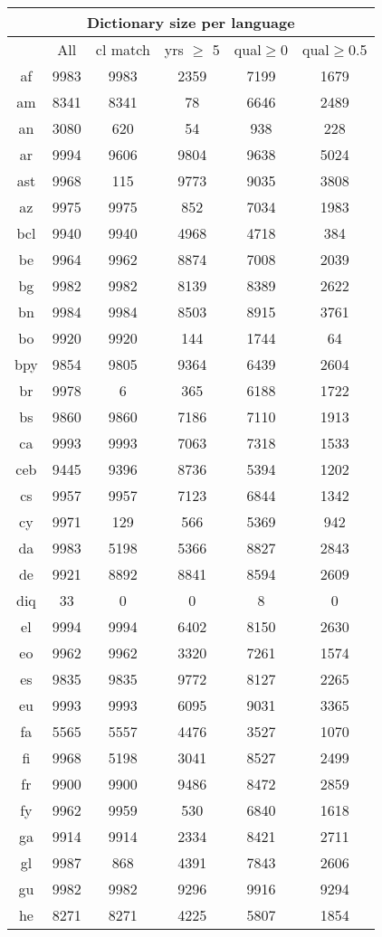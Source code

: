 \begin{figure}[h]
\centering
\begin{tabular}{cccccc}
\multicolumn{6}{c}{Dictionary size per language}\\
\hline\hline
&All&cl match&yrs $\geq$ 5&qual$\geq$0&qual$\geq$0.5\\
\hline\hline
af&9983&9983&2359&7199&1679\\
am&8341&8341&78&6646&2489\\
an&3080&620&54&938&228\\
ar&9994&9606&9804&9638&5024\\
ast&9968&115&9773&9035&3808\\
az&9975&9975&852&7034&1983\\
bcl&9940&9940&4968&4718&384\\
be&9964&9962&8874&7008&2039\\
bg&9982&9982&8139&8389&2622\\
bn&9984&9984&8503&8915&3761\\
bo&9920&9920&144&1744&64\\
bpy&9854&9805&9364&6439&2604\\
br&9978&6&365&6188&1722\\
bs&9860&9860&7186&7110&1913\\
ca&9993&9993&7063&7318&1533\\
ceb&9445&9396&8736&5394&1202\\
cs&9957&9957&7123&6844&1342\\
cy&9971&129&566&5369&942\\
da&9983&5198&5366&8827&2843\\
de&9921&8892&8841&8594&2609\\
diq&33&0&0&8&0\\
el&9994&9994&6402&8150&2630\\
eo&9962&9962&3320&7261&1574\\
es&9835&9835&9772&8127&2265\\
eu&9993&9993&6095&9031&3365\\
fa&5565&5557&4476&3527&1070\\
fi&9968&5198&3041&8527&2499\\
fr&9900&9900&9486&8472&2859\\
fy&9962&9959&530&6840&1618\\
ga&9914&9914&2334&8421&2711\\
gl&9987&868&4391&7843&2606\\
gu&9982&9982&9296&9916&9294\\
he&8271&8271&4225&5807&1854\\

\end{tabular}
\end{figure}
